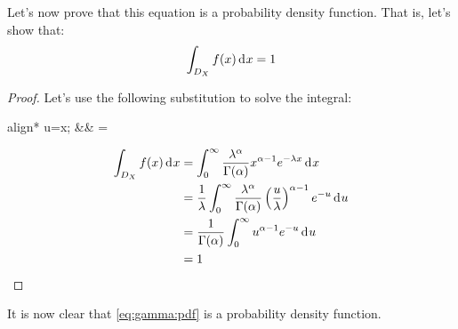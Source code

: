 \documentclass[12pt]{article}
\begin{document}
Let's now prove that this equation is a probability density function. That is, let's show that:
\begin{equation}
	\int_{D_X} f(x)\mathop{}\!\mathrm{d^{}}x = 1
\end{equation}
\begin{proof}
	Let's use the following substitution to solve the integral:
	\begin{empheq}[box=\widefbox]{align*}
		u=\lambda x;	&&	=\lambda{}
	\end{empheq}
	\begin{equation}
		\begin{split}
			\int_{D_X} f(x)\mathop{}\!\mathrm{d^{}}x	&=	\int^\infty_0\frac{\lambda^\alpha}{\Gamma(\alpha)}x^{\alpha -1}e^{-\lambda x}\mathop{}\!\mathrm{d^{}}x\\
									&=	\frac{1}{\lambda}\int^\infty_0\frac{\lambda^\alpha}{\Gamma(\alpha)}\left(\frac{u}{\lambda}\right)^{\alpha-1}e^{-u}\mathop{}\!\mathrm{d^{}}u\\
									&=	\frac{1}{\Gamma(\alpha)}\int^\infty_0 u^{\alpha-1}e^{-u}\mathop{}\!\mathrm{d^{}}u\\
									&=	1
		\end{split}
	\end{equation}
\end{proof}
It is now clear that \autoref{eq:gamma:pdf} is a probability density function.


\pagebreak
\end{document}
